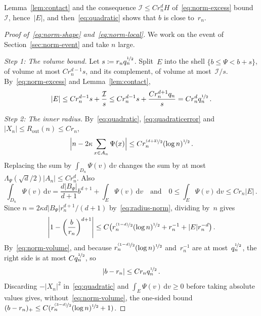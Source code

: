 \documentclass[11pt]{amsart}
\theoremstyle{plain}
\theoremstyle{definition}
\newcommand{\drift}{\kappa}
\newcommand{\gauge}{\Psi}
\newcommand{\dd}{\,\mathrm d}
\newcommand{\nf}{\nicefrac}
\newcommand{\Rout}{R_{\mathrm{out}}}
\numberwithin{equation}{section}
\begin{document}
Lemma~\ref{lem:contact} and the consequence $\mathcal I\leq Cr_n^dH$ of~\eqref{eq:norm-excess} bound~$\mathcal I$, hence~$|E|$, and then~\eqref{eq:quadratic} shows that $b$ is close to~$r_n$.

  \begin{proof}[Proof of~\eqref{eq:norm-shape} and~\eqref{eq:norm-local}]
  We work on the event of Section~\ref{sec:norm-event} and take $n$ large.

\emph{Step 1: The volume bound.} Let $s\coloneqq r_nq_n^{\nf12}$. Split~$E$ into the shell $\{b\leq\gauge<b+s\}$, of volume at most $Cr_n^{d-1}s$, and its complement, of volume at most~$\mathcal I/s$. By~\eqref{eq:norm-excess} and Lemma~\ref{lem:contact},
\begin{equation}\label{eq:norm-volume}
|E|\leq Cr_n^{d-1}s+\frac{\mathcal I}s\leq Cr_n^{d-1}s+\frac{Cr_n^{d+1}q_n}s=Cr_n^dq_n^{\nf12}\, .
\end{equation}

\emph{Step 2: The inner radius.} By~\eqref{eq:quadratic}, \eqref{eq:quadraticerror} and $|X_n|\leq\Rout(n)\leq Cr_n$,
\begin{equation*}
\Bigl|n-2\drift\sum_{x\in A_n}\gauge(x)\Bigr|\leq Cr_n^{\nf{(d+3)}{2}}(\log n)^{\nf12}\, .
\end{equation*}
Replacing the sum by $\int_{D_n}\gauge(v)\dd v$ changes the sum by at most $\Lambda_\gauge(\sqrt d/2)|A_n|\leq Cr_n^d$. Also
\begin{equation*}
\int_{D_n}\gauge(v)\dd v=\frac{d|B_\gauge|}{d+1}b^{d+1}+\int_E\gauge(v)\dd v
\quad\text{and}\quad
0\leq\int_E\gauge(v)\dd v\leq Cr_n|E|\, .
\end{equation*}
Since $n=2\drift d|B_\gauge|r_n^{d+1}/(d+1)$ by~\eqref{eq:radius-norm}, dividing by~$n$ gives
\begin{equation}\label{eq:radius-volume}
\left|1-\left(\frac b{r_n}\right)^{d+1}\right|
\leq C\bigl(r_n^{\nf{(1-d)}{2}}(\log n)^{\nf12}+r_n^{-1}+|E|r_n^{-d}\bigr)\, .
\end{equation}
By~\eqref{eq:norm-volume}, and because $r_n^{\nf{(1-d)}{2}}(\log n)^{\nf12}$ and~$r_n^{-1}$ are at most~$q_n^{\nf12}$, the right side is at most $Cq_n^{\nf12}$, so
\begin{equation}\label{eq:norm-inradius}
|b-r_n|\leq Cr_nq_n^{\nf12}\, .
\end{equation}
Discarding $-|X_n|^2$ in~\eqref{eq:quadratic} and $\int_E\gauge(v)\dd v\geq0$ before taking absolute values gives, without~\eqref{eq:norm-volume}, the one-sided bound $(b-r_n)_+\leq C(r_n^{\nf{(3-d)}{2}}(\log n)^{\nf12}+1)$.


\end{proof}
\end{document}
